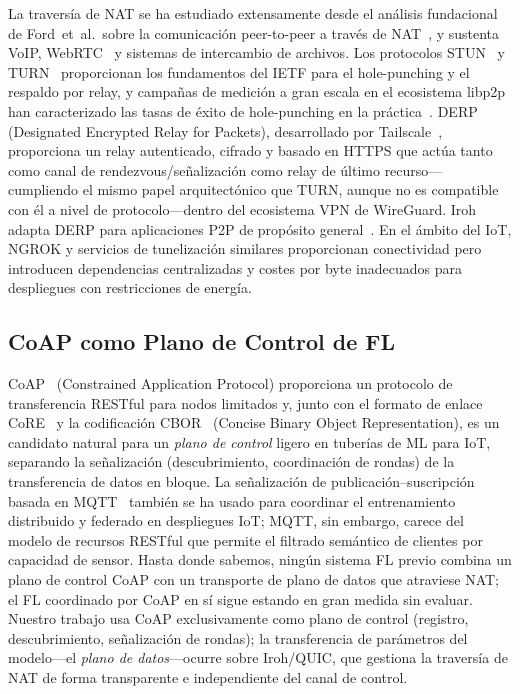 \documentclass[journal]{IEEEtran}
\begin{document}
La traversía de NAT se ha estudiado extensamente desde el análisis fundacional de Ford~et~al.\ sobre la comunicación peer-to-peer a través de NAT~\cite{ford2005,rfc5128}, y sustenta VoIP, WebRTC~\cite{webrtc2021} y sistemas de intercambio de archivos. Los protocolos STUN~\cite{rfc8489} y TURN~\cite{rfc8656} proporcionan los fundamentos del IETF para el hole-punching y el respaldo por relay, y campañas de medición a gran escala en el ecosistema libp2p han caracterizado las tasas de éxito de hole-punching en la práctica~\cite{seemann2022}. DERP (Designated Encrypted Relay for Packets), desarrollado por Tailscale~\cite{tailscale2023}, proporciona un relay autenticado, cifrado y basado en HTTPS que actúa tanto como canal de rendezvous/señalización como relay de último recurso---cumpliendo el mismo papel arquitectónico que TURN, aunque no es compatible con él a nivel de protocolo---dentro del ecosistema VPN de WireGuard. Iroh adapta DERP para aplicaciones P2P de propósito general~\cite{iroh2024}. En el ámbito del IoT, NGROK y servicios de tunelización similares proporcionan conectividad pero introducen dependencias centralizadas y costes por byte inadecuados para despliegues con restricciones de energía.

\subsection{CoAP como Plano de Control de FL}

CoAP~\cite{rfc7252} (Constrained Application Protocol) proporciona un protocolo de transferencia RESTful para nodos limitados y, junto con el formato de enlace CoRE~\cite{rfc6690} y la codificación CBOR~\cite{rfc8949} (Concise Binary Object Representation), es un candidato natural para un \emph{plano de control} ligero en tuberías de ML para IoT, separando la señalización (descubrimiento, coordinación de rondas) de la transferencia de datos en bloque. La señalización de publicación--suscripción basada en MQTT~\cite{mqtt2019} también se ha usado para coordinar el entrenamiento distribuido y federado en despliegues IoT; MQTT, sin embargo, carece del modelo de recursos RESTful que permite el filtrado semántico de clientes por capacidad de sensor. Hasta donde sabemos, ningún sistema FL previo combina un plano de control CoAP con un transporte de plano de datos que atraviese NAT; el FL coordinado por CoAP en sí sigue estando en gran medida sin evaluar. Nuestro trabajo usa CoAP exclusivamente como plano de control (registro, descubrimiento, señalización de rondas); la transferencia de parámetros del modelo---el \emph{plano de datos}---ocurre sobre Iroh/QUIC, que gestiona la traversía de NAT de forma transparente e independiente del canal de control.
\end{document}
